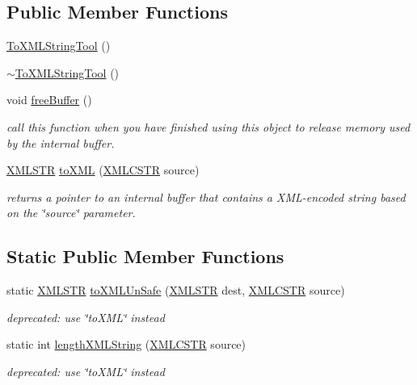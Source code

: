 \subsection*{Public Member Functions}
\begin{DoxyCompactItemize}
\item 
\hyperlink{structToXMLStringTool_a400558cc804818a3b40f2656128edeab}{To\-X\-M\-L\-String\-Tool} ()
\item 
\hyperlink{structToXMLStringTool_a4e0f6022d6b58f323b2c41df83926ca9}{$\sim$\-To\-X\-M\-L\-String\-Tool} ()
\item 
void \hyperlink{structToXMLStringTool_a0572044b9caffb4436b48c7b380fc70f}{free\-Buffer} ()
\begin{DoxyCompactList}\small\item\em call this function when you have finished using this object to release memory used by the internal buffer. \end{DoxyCompactList}\item 
\hyperlink{xmlParser_8h_a849d96105aa0c8f64b5c10d9151a3cdc}{X\-M\-L\-S\-T\-R} \hyperlink{structToXMLStringTool_a3e0bb98fc6bf2c8b855fa4ea573177c2}{to\-X\-M\-L} (\hyperlink{xmlParser_8h_acdb0d6fd8dd596384b438d86cfb2b182}{X\-M\-L\-C\-S\-T\-R} source)
\begin{DoxyCompactList}\small\item\em returns a pointer to an internal buffer that contains a X\-M\-L-\/encoded string based on the \char`\"{}source\char`\"{} parameter. \end{DoxyCompactList}\end{DoxyCompactItemize}
\subsection*{Static Public Member Functions}
\begin{DoxyCompactItemize}
\item 
static \hyperlink{xmlParser_8h_a849d96105aa0c8f64b5c10d9151a3cdc}{X\-M\-L\-S\-T\-R} \hyperlink{structToXMLStringTool_afcb136a02b27809eecb2edcd1164c2d8}{to\-X\-M\-L\-Un\-Safe} (\hyperlink{xmlParser_8h_a849d96105aa0c8f64b5c10d9151a3cdc}{X\-M\-L\-S\-T\-R} dest, \hyperlink{xmlParser_8h_acdb0d6fd8dd596384b438d86cfb2b182}{X\-M\-L\-C\-S\-T\-R} source)
\begin{DoxyCompactList}\small\item\em deprecated\-: use \char`\"{}to\-X\-M\-L\char`\"{} instead \end{DoxyCompactList}\item 
static int \hyperlink{structToXMLStringTool_a534ac6cced1b13ecd073d988a73679a3}{length\-X\-M\-L\-String} (\hyperlink{xmlParser_8h_acdb0d6fd8dd596384b438d86cfb2b182}{X\-M\-L\-C\-S\-T\-R} source)
\begin{DoxyCompactList}\small\item\em deprecated\-: use \char`\"{}to\-X\-M\-L\char`\"{} instead \end{DoxyCompactList}\end{DoxyCompactItemize}

